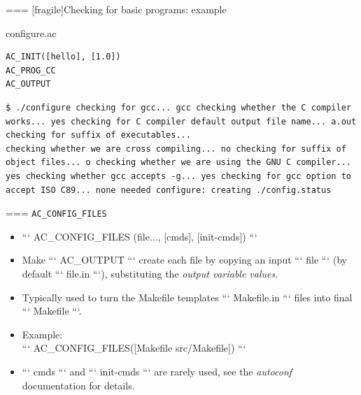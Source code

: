 === [fragile]{Checking for basic programs: example}

\begin{block}{configure.ac}
\begin{verbatim}
AC_INIT([hello], [1.0])
AC_PROG_CC
AC_OUTPUT
\end{verbatim}
\end{block}

\begin{block}{}
\begin{verbatim}
$ ./configure checking for gcc... gcc checking whether the C compiler works... yes checking for C compiler default output file name... a.out checking for suffix of executables...
checking whether we are cross compiling... no checking for suffix of object files... o checking whether we are using the GNU C compiler... yes checking whether gcc accepts -g... yes checking for gcc option to accept ISO C89... none needed configure: creating ./config.status
\end{verbatim}
\end{block}



=== {{\tt AC\_CONFIG\_FILES}}
  \begin{itemize}
  \item ``` AC_CONFIG_FILES (file..., [cmds], [init-cmds]) ```
  \item Make ``` AC_OUTPUT ``` create each file by copying an input
    ``` file ``` (by default ``` file.in ```), substituting the {\em
      output variable values}.
  \item Typically used to turn the Makefile templates
    ``` Makefile.in ``` files into final ``` Makefile ```.
  \item Example:\\
    ``` AC_CONFIG_FILES([Makefile src/Makefile]) ```
  \item ``` cmds ``` and ``` init-cmds ``` are rarely used, see the {\em
      autoconf} documentation for details.
  \end{itemize}


